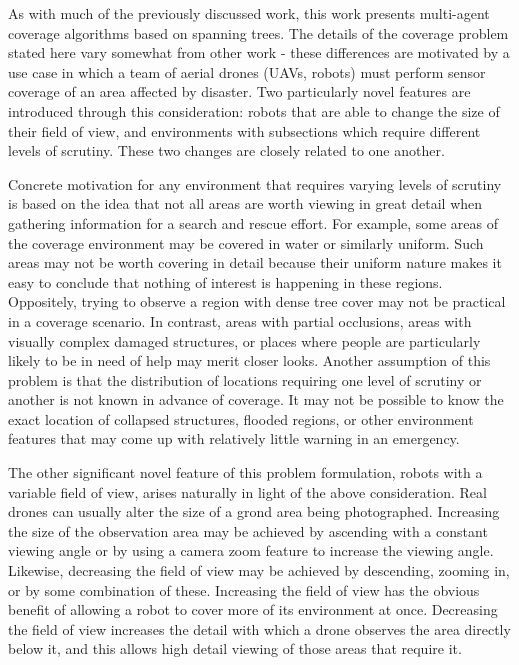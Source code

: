 \documentclass[letterpaper, 12pt, leqno]{report}
\begin{document}
As with much of the previously discussed work, this work presents multi-agent coverage algorithms based on spanning trees. The details of the coverage problem stated here vary somewhat from other work - these differences are motivated by a use case in which a team of aerial drones (UAVs, robots) must perform sensor coverage of an area affected by disaster. Two particularly novel features are introduced through this consideration: robots that are able to change the size of their field of view, and environments with subsections which require different levels of scrutiny. These two changes are closely related to one another.

Concrete motivation for any environment that requires varying levels of scrutiny is based on the idea that not all areas are worth viewing in great detail when gathering information for a search and rescue effort. For example, some areas of the coverage environment may be covered in water or similarly uniform. Such areas may not be worth covering in detail because their uniform nature makes it easy to conclude that nothing of interest is happening in these regions. Oppositely, trying to observe a region with dense tree cover may not be practical in a coverage scenario. In contrast, areas with partial occlusions, areas with visually complex damaged structures, or places where people are particularly likely to be in need of help may merit closer looks. Another assumption of this problem is that the distribution of locations requiring one level of scrutiny or another is not known in advance of coverage. It may not be possible to know the exact location of collapsed structures, flooded regions, or other environment features that may come up with relatively little warning in an emergency.

The other significant novel feature of this problem formulation, robots with a variable field of view, arises naturally in light of the above consideration. Real drones can usually alter the size of a grond area being photographed. Increasing the size of the observation area may be achieved by ascending with a constant viewing angle or by using a camera zoom feature to increase the viewing angle. Likewise, decreasing the field of view may be achieved by descending, zooming in, or by some combination of these. Increasing the field of view has the obvious benefit of allowing a robot to cover more of its environment at once. Decreasing the field of view increases the detail with which a drone observes the area directly below it, and this allows high detail viewing of those areas that require it.
\end{document}
